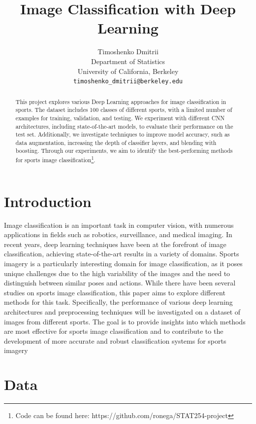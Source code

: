 \documentclass[reqno]{article}
\title{Image Classification with Deep Learning}
\author{
	Timoshenko Dmitrii\\
	Department of Statistics\\
	University of California, Berkeley\\
	\texttt{timoshenko\_dmitrii@berkeley.edu} \\
}
\begin{document}
	
	\maketitle
	
	\begin{abstract}
				This project explores various Deep Learning approaches for image classification in sports. The dataset includes 100 classes of different sports, with a limited number of examples for training, validation, and testing. We experiment with different CNN architectures, including state-of-the-art models, to evaluate their performance on the test set. Additionally, we investigate techniques to improve model accuracy, such as data augmentation, increasing the depth of classifier layers, and blending with boosting. Through our experiments, we aim to identify the best-performing methods for sports image classification\footnote{Code can be found here: https://github.com/ronega/STAT254-project}.
	\end{abstract}
	
	\section{Introduction}
	Image classification is an important task in computer vision, with numerous applications in fields such as robotics, surveillance, and medical imaging. In recent years, deep learning techniques have been at the forefront of image classification, achieving state-of-the-art results in a variety of domains. Sports imagery is a particularly interesting domain for image classification, as it poses unique challenges due to the high variability of the images and the need to distinguish between similar poses and actions. While there have been several studies on sports image classification, this paper aims to explore different methods for this task. Specifically, the performance of various deep learning architectures and preprocessing techniques will be investigated on a dataset of images from different sports. The goal is to provide insights into which methods are most effective for sports image classification and to contribute to the development of more accurate and robust classification systems for sports imagery
	
	\section{Data}
	
\end{document}

